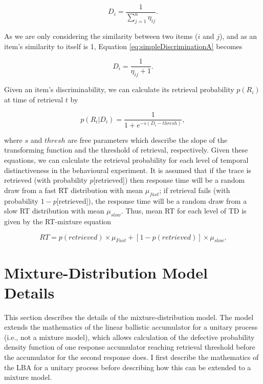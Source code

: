 \documentclass[a4paper, man, natbib]{apa6}
\begin{document}
\begin{equation}
D_{i} = \frac{1}{\sum\limits_{j = 1}^n \eta_{ij}}.
\label{eq:simpleDiscriminationA}
\end{equation}

As we are only considering the similarity between two items ($i$ and $j$), and as an item's similarity to itself is 1, Equation \ref{eq:simpleDiscriminationA} becomes

\begin{equation}
D_{i} = \frac{1}{\eta_{ij} + 1}.
\label{eq:simpleDiscriminationB}
\end{equation}

Given an item's discriminability, we can calculate its retrieval probability $p(R_{i})$ at time of retrieval $t$ by

\begin{equation}
p(R_{i}|D_{i}) = \frac{1}{1 + e^{-s(D_{i} - thresh)}}, 
\label{eq:simpleProb}
\end{equation}

\noindent where $s$ and $thresh$ are free parameters which describe the slope of the transforming function and the threshold of retrieval, respectively. Given these equations, we can calculate the retrieval probability for each level of temporal distinctiveness in the behavioural experiment. It is assumed that if the trace is retrieved (with probability $p$[retrieved]) then response time will be a random draw from a fast RT distribution with mean $\mu_{fast}$; if retrieval fails (with probability $1 - p$[retrieved]), the response time will be a random draw from a slow RT distribution with mean $\mu_{slow}$. Thus, mean RT for each level of TD is given by the RT-mixture equation

\begin{equation}
RT = p(retrieved) \times \mu_{Fast} + [1 - p(retrieved)] \times \mu_{slow}.
\label{eq:tdMixtureNew}
\end{equation}
\appendix
\section{Mixture-Distribution Model Details}

This section describes the details of the mixture-distribution model. The model extends the mathematics of the linear ballistic accumulator \citep{Brown2008} for a unitary process (i.e., not a mixture model), which allows calculation of the defective probability density function of one response accumulator reaching retrieval threshold before the accumulator for the second response does. I first describe the mathematics of the LBA for a unitary process before describing how this can be extended to a mixture model. 
\end{document}
